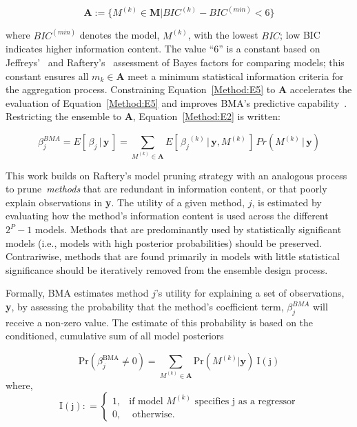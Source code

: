 \documentclass[12pt]{article}
\newcommand{\+}[1]{\ensuremath{\mathbf{#1}}}
\begin{document}
\begin{equation}
	\label{Method:E5}
	\textbf{A} := \{M^{(k)} \in \textbf{M} | BIC^{(k)} - BIC^{(min)} < 6\}
\end{equation}
      
where $BIC^{(min)}$ denotes the model, $M^{(k)}$, with the lowest $BIC$; low BIC indicates higher information content. The value ``6'' is a constant based on Jeffreys'~\cite{Jefferys:1961} and Raftery's~\cite{Raftery:1995} assessment of Bayes factors for comparing models; this constant ensures all $m_k \in \mathbf{A}$ meet a minimum statistical information criteria for the aggregation process. Constraining Equation~\ref{Method:E5} to $\+A$ accelerates the evaluation of Equation~\ref{Method:E5} and improves BMA's predictive capability~\cite{Raftery:1998,Madigan:1994}.  Restricting the ensemble to $\+A$, Equation~\ref{Method:E2} is written:

\begin{equation}
\label{Method:E6}
\beta^{BMA}_j =  E[\,\beta_j \,|\, \+y\,] = \sum_{M^{(k)}\in \mathbf{A}} E[\,{\beta_j}^{(k)} \,|\, \+y,M^{(k)}\,] \,Pr(M^{(k)} \,|\, \textbf{y})
\end{equation}


This work builds on Raftery's model pruning strategy with an analogous process to prune~\emph{methods} that are redundant in information content, or that poorly explain observations in \textbf{y}.  The utility of a given method, $j$, is estimated by evaluating how the method's information content is used across the different $2^P -1 $ models. Methods that are predominantly used by statistically significant models (i.e., models with high posterior probabilities) should be preserved. Contrariwise, methods that are found primarily in models with little statistical significance should be iteratively removed from the ensemble design process. 

Formally, BMA estimates method $j$'s utility for explaining a set of observations, \textbf{y}, by assessing the probability that the method's coefficient term, $\beta^{BMA}_j$ will receive a non-zero value. The estimate of this probability is based on the conditioned, cumulative sum of all model posteriors 

\begin{equation}
\label{Method:E7}
\mathrm{Pr}(\beta_j^{\text{BMA}}\neq 0) =   \sum_{M^{(k)}\in\mathbf{A}} {\mathrm{Pr}}(M^{(k)} | \textbf{y}) \:{\mathrm{I(j)}}
\end{equation}
where,
\begin{equation}
\label{eq:bma-prob-neq0-ID}
\mathrm{I(j)}: = 
\begin{cases}
1,&\text{if model $M^{(k)}$ specifies j as a regressor} 
\\
0,&\text{ otherwise}.
\end{cases}
\end{equation}
 
\end{document}
